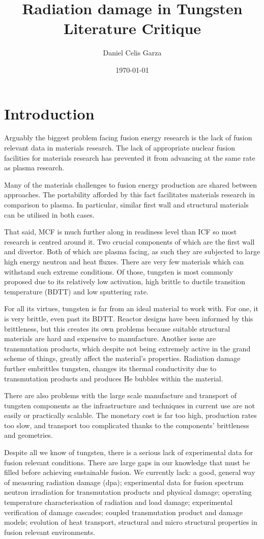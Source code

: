 \documentclass[12pt, a4paper]{article}
\title{Radiation damage in Tungsten Literature Critique}
\author{Daniel Celis Garza}
\date{\today}
\begin{document}
	\maketitle
	\section{Introduction}\label{s:intro}
		Arguably the biggest problem facing fusion energy research is the lack of fusion relevant data in materials research. The lack of appropriate nuclear fusion facilities for materials research has prevented it from advancing at the same rate as plasma research.
		
		Many of the materials challenges to fusion energy production are shared between approaches. The portability afforded by this fact facilitates materials research in comparison to plasma. In particular, similar first wall and structural materials can be utilised in both cases.
		
		That said, MCF is much further along in readiness level than ICF so most research is centred around it. Two crucial components of which are the first wall and divertor. Both of which are plasma facing, as such they are subjected to large high energy neutron and heat fluxes. There are very few materials which can withstand such extreme conditions. Of those, tungsten is most commonly proposed due to its relatively low activation, high brittle to ductile transition temperature (BDTT) and low sputtering rate.
		
		For all its virtues, tungsten is far from an ideal material to work with. For one, it is very brittle, even past its BDTT. Reactor designs have been informed by this brittleness, but this creates its own problems because suitable structural materials are hard and expensive to manufacture. Another issue are transmutation products, which despite not being extremely active in the grand scheme of things, greatly affect the material's properties. Radiation damage further embrittles tungsten, changes its thermal conductivity due to transmutation products and produces He bubbles within the material. 
		
		There are also problems with the large scale manufacture and transport of tungsten components as the infrastructure and techniques in current use are not easily or practically scalable. The monetary cost is far too high, production rates too slow, and transport too complicated thanks to the components' brittleness and geometries.
		
		Despite all we know of tungsten, there is a serious lack of experimental data for fusion relevant conditions. There are large gaps in our knowledge that must be filled before achieving sustainable fusion. We currently lack: a good, general way of measuring radiation damage (dpa); experimental data for fusion spectrum neutron irradiation for transmutation products and physical damage; operating temperature characterisation of radiation and load damage; experimental verification of damage cascades; coupled transmutation product and damage models; evolution of heat transport, structural and micro structural properties in fusion relevant environments.
		
\end{document}
